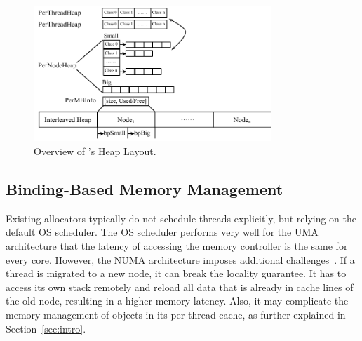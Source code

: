 \begin{figure}[h]
\begin{center}
\includegraphics[width=0.8\textwidth]{figure/heaplayout}
\end{center}
\vspace{-0.1in}
\caption{Overview of \NA{}'s Heap Layout.
\label{fig:overview}}
\vspace{-0.1in}
\end{figure}

\subsection{Binding-Based Memory Management} 
\label{sec:taskassign}

Existing allocators typically do not schedule threads explicitly, but relying on the default OS scheduler. The OS scheduler performs very well for the UMA architecture that the latency of accessing the memory controller is the same for every core. However, the NUMA architecture imposes additional challenges~\cite{Majo:2015:LPC:2688500.2688509}. If a thread is migrated to a new node, it can break the locality guarantee. It has to access its own stack remotely and reload all data that is already in cache lines of the old node, resulting in a higher memory latency. Also, it may complicate the memory management of objects in its per-thread cache, as further explained in Section~\ref{sec:intro}. 

